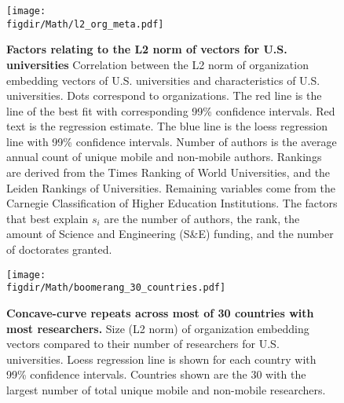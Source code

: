 \documentclass[12pt]{article} %
\def\figdir{../Figs}
\begin{document}
%
%



%
%
\begin{figure}[hp!]
	\centering
	\texttt{[image: \\figdir/Math/l2\_org\_meta.pdf]}
	\caption{
		\textbf{Factors relating to the L2 norm of vectors for U.S. universities}
		Correlation between the L2 norm of organization embedding vectors of U.S. universities and characteristics of U.S. universities.
		Dots correspond to organizations.
		The red line is the line of  the best fit with corresponding 99\% confidence intervals.
		Red text is the regression estimate.
		The blue line is the loess regression line with 99\% confidence intervals.
		Number of authors is the average annual count of unique mobile and non-mobile authors.
		Rankings are derived from the Times Ranking of World Universities, and the Leiden Rankings of Universities.
		Remaining variables come from the Carnegie Classification of Higher Education Institutions.
		The factors that best explain $s_i$ are the number of authors, the rank, the amount of Science and Engineering (S\&E) funding, and the number of doctorates granted.
	}
	\label{fig:supp:length_vs_metaInfo}
\end{figure}



%
%
\begin{figure}[h!]
	\centering
	\texttt{[image: \\figdir/Math/boomerang\_30\_countries.pdf]}
	\caption{
		\textbf{Concave-curve repeats across most of 30 countries with most researchers.}
		Size (L2 norm) of organization embedding vectors compared to their number of researchers for U.S. universities.
		Loess regression line is shown for each country with 99\% confidence intervals.
		Countries shown are the 30 with the largest number of total unique mobile and non-mobile researchers.
	}
	\label{fig:concave30}
\end{figure}
\end{document}
